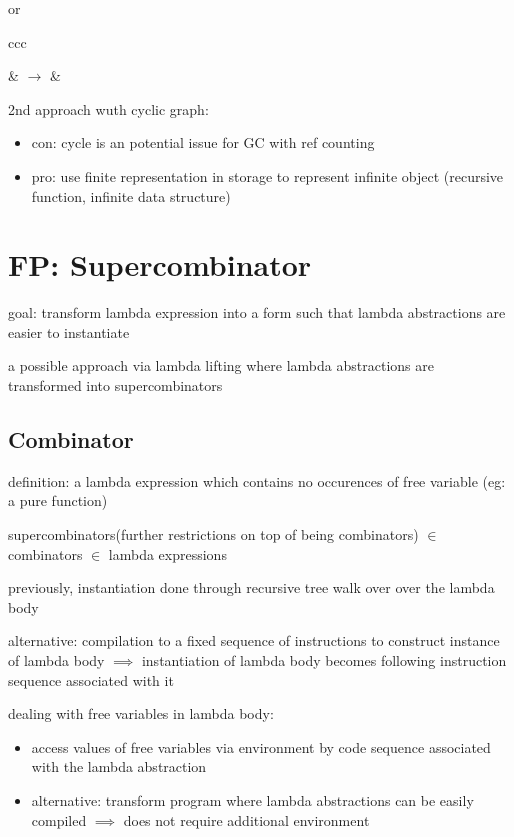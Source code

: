 \documentclass[8pt]{extarticle}
\begin{document}
\begin{multicols*}{2}
\begin{tblr}[]{}
or

\begin{tblr}{ccc}
 &
$\rightarrow$ &
\end{tblr}

2nd approach wuth cyclic graph:
\begin{itemize}
\item con: cycle is an potential issue for GC with ref counting
\item pro: use finite representation in storage to represent infinite object (recursive function, infinite data structure)
\end{itemize}


\section{FP: Supercombinator}

goal: transform lambda expression into a form such that lambda abstractions are easier to instantiate

a possible approach via lambda lifting where lambda abstractions are transformed into supercombinators

\subsection{Combinator}
definition: a lambda expression which contains no occurences of free variable (eg: a pure function)

supercombinators(further restrictions on top of being combinators) $\in$ combinators $\in$ lambda expressions

previously, instantiation done through recursive tree walk over over the lambda body

alternative: compilation to a fixed sequence of instructions to construct instance of lambda body $\implies$ instantiation of lambda body becomes following instruction sequence associated with it

dealing with free variables in lambda body:
\begin{itemize}
\item access values of free variables via environment by code sequence associated with the lambda abstraction
\item alternative: transform program where lambda abstractions can be easily compiled $\implies$ does not require additional environment
\end{itemize}


\end{tblr}
\end{multicols*}
\end{document}
